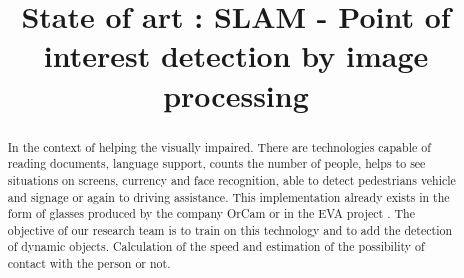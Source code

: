 \documentclass[conference,compsoc]{IEEEtran}
\begin{document}
%
\title{State of art : SLAM - Point of interest detection by image processing}


\author{
\and
{}
\and
{}
\and
{}
}

\maketitle

\begin{abstract}
In the context of helping the visually impaired. There are technologies capable of reading documents, language support, counts the number of people, helps to see situations on screens, currency and face recognition, able to detect pedestrians vehicle and signage or again to driving assistance. This implementation already exists in the form of glasses produced by the company OrCam \cite{orcam_2021} or in the EVA project \cite{eva}.
The objective of our research team is to train on this technology and to add the detection of dynamic objects. Calculation of the speed and estimation of the possibility of contact with the person or not.
\end{abstract}
\hspace{10pt}
\end{document}
